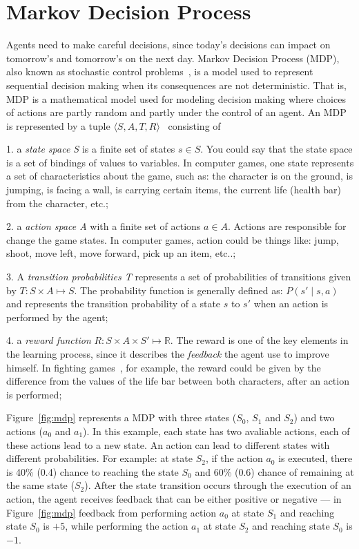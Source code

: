 \section{Markov Decision Process}
\label{sec:markov}

Agents need to make careful decisions, since today's decisions can impact on tomorrow's and tomorrow's on the next day.
Markov Decision Process (MDP), also known as stochastic control problems~\cite{puterman1994markov}, is a model used to represent sequential decision making when its consequences are not deterministic.
That is, MDP is a mathematical model used for modeling decision making where choices of actions are partly random and partly under the control of an agent.
An MDP is represented by a tuple $\langle S, A, T, R\rangle$~\cite{graepel2004learningfight, taylor2011teachingmario} consisting of

1. a \textit{state space S} is a finite set of states $s \in S$.
You could say that the state space is a set of bindings of values to variables.
In computer games, one state represents a set of characteristics about the game, such as:
the character is on the ground, is jumping, is facing a wall, is carrying certain items, the current life (health bar) from the character, etc.;

2. a \textit{action space A} with a finite set of actions $a \in A$.
Actions are responsible for change the game states. In computer games, action could be things like:
jump, shoot, move left, move forward, pick up an item, etc..;

3. A \textit{transition probabilities T} represents a set of probabilities of transitions given by
$T : S \times A \mapsto S$. The probability function is generally defined as:
$P(s' \mid s,a)$ and represents the transition probability of a state $s$ to $s'$ when
an action is performed by the agent;

4. a \textit{reward function} $R : S \times A \times S' \mapsto \mathbb{R}$.
The reward is one of the key elements in the learning process, since it describes
the \textit{feedback} the agent use to improve himself.
In fighting games~\cite{graepel2004learningfight}, for example, the reward could be given
by the difference from the values of the life bar between both characters, after an action is performed;

Figure~\ref{fig:mdp} represents a MDP with three states ($S_0$, $S_1$ and $S_2$) and
two actions ($a_0$ and $a_1$). In this example, each state has two avaliable actions,
each of these actions lead to a new state. An action can lead to different states with different probabilities.
For example: at state $S_2$, if the action $a_0$ is executed, there is 40\% (0.4) chance to
reaching the state $S_0$ and 60\% (0.6) chance of remaining at the same state ($S_2$).
After the state transition occurs through the execution of an action, the agent receives feedback that can be
either positive or negative --- in Figure~\ref{fig:mdp} feedback from performing action $a_0$ at state $S_1$
and reaching state $S_0$ is $+5$, while performing the action $a_1$ at state $S_2$ and reaching state $S_0$
is $-1$.

